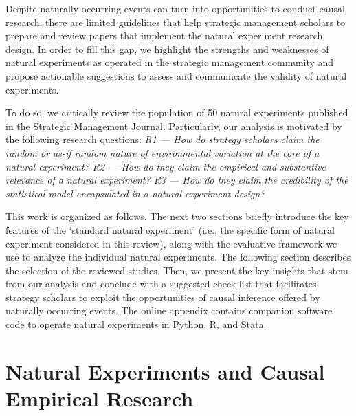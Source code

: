 \documentclass[11pt, english]{article}
\begin{document}
Despite naturally occurring events can turn into opportunities to conduct causal
research, there are limited guidelines that help strategic management
scholars to prepare and review papers that implement the natural
experiment research design. In order to fill this gap, we highlight the 
strengths and weaknesses of natural experiments as operated in the strategic 
management community and propose actionable suggestions to assess and communicate
the validity of natural experiments.

To do so, we critically review the population of 50 natural experiments
published in the Strategic Management Journal. Particularly, our analysis is
motivated by the following research questions: \emph{R1 --- How do strategy
    scholars claim the random or as-if random nature of environmental variation
    at the core of a natural experiment? R2 --- How do they claim the empirical
    and substantive relevance of a natural experiment? R3 --- How do they claim
    the credibility of the statistical model encapsulated in a natural
experiment design?}




This work is organized as follows. The next two sections briefly introduce the key
features of the `standard natural experiment' (i.e., the specific form of
natural experiment considered in this review), along with the evaluative
framework we use to analyze the individual natural experiments. The following
section describes the selection of the reviewed studies. Then, we present the
key insights that stem from our analysis and conclude with a suggested
check-list that facilitates strategy scholars to exploit the opportunities of
causal inference offered by naturally occurring events. The online appendix
contains companion software code to operate natural experiments in Python, R,
and Stata.


\section{Natural Experiments and Causal Empirical Research}
\label{sec:standard_ne}
\end{document}
